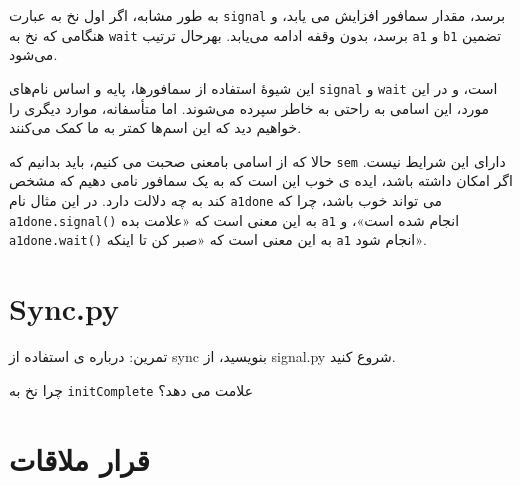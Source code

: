 \documentclass{book}
\begin{document}
به طور مشابه، اگر اول نخ  به عبارت \texttt{signal} برسد، مقدار سمافور افزایش می یابد، و هنگامی که نخ  
به \texttt{wait} برسد، بدون وقفه ادامه 
می‌یابد. بهرحال 
ترتیب \texttt{a1} و \texttt{b1} تضمین می‌شود.

این شیوهٔ استفاده از سمافورها، پایه و اساس نام‌های \texttt{signal} و \texttt{wait} است، 
و در این مورد، این اسامی به راحتی به خاطر سپرده می‌شوند. اما متأسفانه، موارد دیگری را خواهیم دید که این اسم‌ها کمتر به ما کمک می‌کنند.

حالا که از اسامی بامعنی صحبت می کنیم، باید بدانیم که \texttt{sem} دارای این شرایط نیست. 
اگر امکان داشته باشد، ایده ی خوب این است که به یک سمافور نامی دهیم که مشخص کند به چه دلالت دارد. 
در این مثال نام \texttt{a1done} می تواند خوب باشد، چرا که \texttt{ a1done.signal()} 
به این معنی است که «علامت بده \texttt{a1} انجام شده است»، و \texttt{a1done.wait()} 
به این معنی است که «صبر کن تا اینکه \texttt{a1} انجام شود».

\section{Sync.py}
\label{sync.py}

تمرین: درباره ی استفاده از sync بنویسید، از signal.py شروع کنید.

چرا نخ  به \texttt{initComplete} علامت می دهد؟


\section{قرار ملاقات}
\label{rendezvous}
\end{document}
